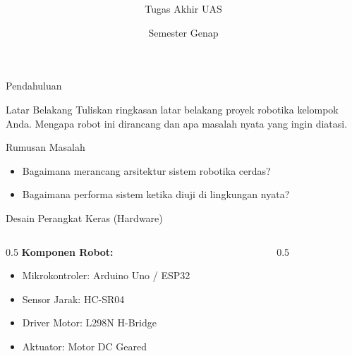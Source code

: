 \documentclass[aspectratio=169]{beamer}
\title[\JudulSingkat]{\texorpdfstring{\textbf{\JudulMakalah}}{\JudulMakalah}}
\subtitle{Tugas Akhir UAS \MataKuliah}
\author[Kelompok \AnggotaSatu{} dkk.]{%
  \texorpdfstring{%
    \textbf{Anggota Kelompok:}\\[0.2cm]
    \begin{tabular}{cc}
        \AnggotaSatu\ (\NIMSatu) & \AnggotaDua\ (\NIMDua) \\
        \AnggotaTiga\ (\NIMTiga) & \AnggotaEmpat\ (\NIMEmpat)
    \end{tabular}%
  }{Kelompok \AnggotaSatu, \AnggotaDua, \AnggotaTiga, \AnggotaEmpat}%
}
\institute[\Universitas]{%
  \texorpdfstring{%
    \Fakultas\\
    \Universitas%
  }{\Fakultas, \Universitas}%
}
\date{Semester Genap \TahunAkademik}
\begin{document}
\begin{frame}
    \titlepage
\end{frame}

\begin{frame}{Pendahuluan}
    \begin{block}{Latar Belakang}
        Tuliskan ringkasan latar belakang proyek robotika kelompok Anda. Mengapa robot ini dirancang dan apa masalah nyata yang ingin diatasi.
    \end{block}
    \begin{block}{Rumusan Masalah}
        \begin{itemize}
            \item Bagaimana merancang arsitektur sistem robotika cerdas?
            \item Bagaimana performa sistem ketika diuji di lingkungan nyata?
        \end{itemize}
    \end{block}
\end{frame}

\begin{frame}{Desain Perangkat Keras (Hardware)}
    \begin{columns}
        \begin{column}{0.5\textwidth}
            \textbf{Komponen Robot:}
            \begin{itemize}
                \item Mikrokontroler: Arduino Uno / ESP32
                \item Sensor Jarak: HC-SR04
                \item Driver Motor: L298N H-Bridge
                \item Aktuator: Motor DC Geared
            \end{itemize}
        \end{column}
        \begin{column}{0.5\textwidth}
            \centering
        \end{column}
    \end{columns}
\end{frame}
\end{document}

